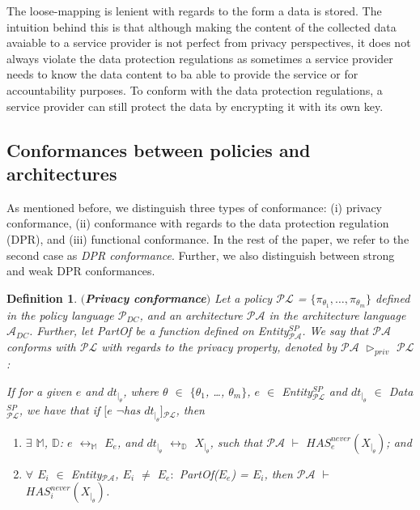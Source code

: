 \documentclass[a4paper]{article}
\newtheorem{ttd}{Definition}
\begin{document}
The loose-mapping is lenient with regards to the form a data is stored. The intuition behind this is that although making the content of the collected data avaiable to a service provider is not perfect from privacy perspectives,  it does not always violate the data protection regulations as sometimes a service provider needs to know the data content to ba able to provide the service or for accountability purposes. To conform with the data protection regulations, a service provider can still protect the data by encrypting it with its own key.  

\subsection{Conformances between policies and architectures}
\label{conformances}

As mentioned before, we distinguish three types of conformance: (i) privacy conformance, (ii) conformance with regards to the data protection regulation (DPR), and (iii) functional conformance. In the rest of the paper, we refer to the second case as \textit{DPR conformance}. Further, we also distinguish between strong and weak DPR conformances. 

\begin{ttd} $($\textbf{Privacy conformance}$)$
Let a policy $\mathcal{P}\mathcal{L}$ = $\{\pi_{\theta_1}, \dots, \pi_{\theta_m}\}$ defined in the policy language $\mathcal{P}_{DC}$, and an   
architecture $\mathcal{P}\mathcal{A}$ in the architecture language $\mathcal{A}_{DC}$. Further, let \textit{PartOf} be a function defined on \textit{Entity}$^{SP}_{\mathcal{P}\mathcal{A}}$.  We say that $\mathcal{P}\mathcal{A}$ conforms with $\mathcal{P}\mathcal{L}$ with regards to the privacy property, denoted by  $\mathcal{P}\mathcal{A}$ $\triangleright_{priv}$ $\mathcal{P}\mathcal{L}$:

If for a given $e$ and $dt_{|_{\theta}}$, where $\theta$ $\in$ $\{$$\theta_1$, \dots, $\theta_m$$\}$, $e$ $\in$ \textit{Entity}$^{SP}_{\mathcal{P}\mathcal{L}}$ and $dt_{|_{\theta}}$ $\in$ \textit{Data}$^{SP}_{\mathcal{P}\mathcal{L}}$,  we have that if $[e$ $\neg$has $dt_{|_{\theta}}]$$_{\mathcal{P}\mathcal{L}}$, then 
\begin{enumerate}
\item $\exists$ $\mathbb{M}$, $\mathbb{D}$: $e$ $\leftrightarrow_\mathbb{M}$ $E_e$,  and  $dt_{|_{\theta}}$ $\leftrightarrow_\mathbb{D}$ $X_{|_{\theta}}$, such that $\mathcal{P}\mathcal{A}$ $\vdash$ $\textit{HAS}_e^\textit{never} \left(X_{|_{\theta}} \right)$; and 

\item $\forall$ $E_i$ $\in$ \textit{Entity}$_{\mathcal{P}\mathcal{A}}$, $E_i$ $\neq$ $E_e$$:$ \textit{PartOf}($E_e$) = $E_i$,     then $\mathcal{P}\mathcal{A}$ $\vdash$ $\textit{HAS}_i^\textit{never} \left(X_{|_{\theta}} \right)$.
\end{enumerate}

\end{ttd} 
\end{document}
